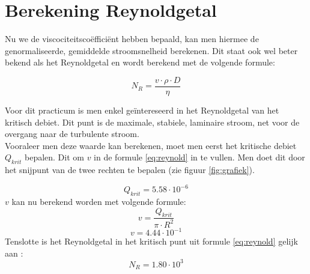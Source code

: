 \section{Berekening Reynoldgetal}

Nu we de viscociteitsco\"effici\"ent hebben bepaald, kan men
hiermee de genormaliseerde, gemiddelde stroomsnelheid berekenen.
Dit staat ook wel beter bekend als het Reynoldgetal en wordt
berekend met de volgende formule:

\begin{equation}
    \label{eq:reynold}
    N_R = \frac{v\cdot \rho \cdot D}{\eta}
\end{equation}

Voor dit practicum is men enkel geïntereseerd in het Reynoldgetal
van het kritisch debiet. Dit punt is de maximale, stabiele, laminaire stroom,
net voor de overgang naar de turbulente stroom.\\

Vooraleer men deze waarde kan berekenen, moet men eerst het
kritische debiet $Q_{krit}$ bepalen. Dit om $v$ in de formule
\eqref{eq:reynold} in te vullen. Men doet dit door het snijpunt van 
de twee rechten te bepalen (zie figuur \ref{fig:grafiek}).

\begin{equation*}
    Q_{krit} = 5.58 \cdot 10^{-6}
\end{equation*}
$v$ kan nu berekend worden met volgende formule:
\begin{equation}
    v = \frac{Q_{krit}}{\pi \cdot R^2}
\end{equation}
\begin{equation*}
    v = 4.44 \cdot 10^{-1}
\end{equation*}
Tenslotte is het Reynoldgetal in het kritisch punt uit formule \eqref{eq:reynold} gelijk aan :
\begin{equation*}
    N_R = 1.80 \cdot 10^{3}
\end{equation*}
